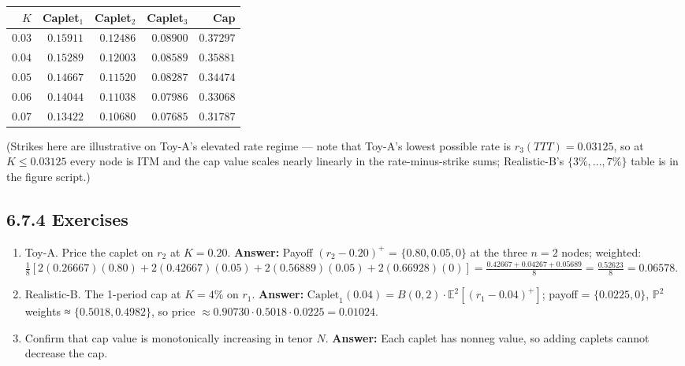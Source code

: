 \documentclass[
  10pt,
  twoside]{book}
\newcounter{none} %
\providecommand{\tightlist}{%
  \setlength{\itemsep}{0pt}\setlength{\parskip}{0pt}}
\begin{document}
{\def\LTcaptype{none} %
\begin{table}[H]
\centering
\begin{tabular}{|r|r|r|r|r|}
\toprule
\(K\) & Caplet\(_1\) & Caplet\(_2\) & Caplet\(_3\) & Cap \\
\midrule



\(0.03\) & \(0.15911\) & \(0.12486\) & \(0.08900\) & \(0.37297\) \\
\(0.04\) & \(0.15289\) & \(0.12003\) & \(0.08589\) & \(0.35881\) \\
\(0.05\) & \(0.14667\) & \(0.11520\) & \(0.08287\) & \(0.34474\) \\
\(0.06\) & \(0.14044\) & \(0.11038\) & \(0.07986\) & \(0.33068\) \\
\(0.07\) & \(0.13422\) & \(0.10680\) & \(0.07685\) & \(0.31787\) \\
\bottomrule
\end{tabular}
\end{table}
}

(Strikes here are illustrative on Toy-A's elevated rate regime --- note
that Toy-A's lowest possible rate is \(r_3(TTT) = 0.03125\), so at
\(K \leq 0.03125\) every node is ITM and the cap value scales nearly
linearly in the rate-minus-strike sums; Realistic-B's
\(\{3\%,..., 7\%\}\) table is in the figure script.)

\subsection{6.7.4 Exercises}\label{exercises-33}

\begin{enumerate}
\def\labelenumi{\arabic{enumi}.}
\tightlist
\item
  Toy-A. Price the caplet on \(r_2\) at \(K = 0.20\). \textbf{Answer:}
  Payoff \((r_2 - 0.20)^+\) = \(\{0.80, 0.05, 0\}\) at the three \(n=2\)
  nodes; weighted:
  \(\tfrac{1}{8}[2(0.26667)(0.80) + 2(0.42667)(0.05) + 2(0.56889)(0.05) + 2(0.66928)(0)] = \tfrac{0.42667 + 0.04267 + 0.05689}{8} = \tfrac{0.52623}{8} = 0.06578\).
\item
  Realistic-B. The 1-period cap at \(K = 4\%\) on \(r_1\).
  \textbf{Answer:}
  \(\text{Caplet}_1(0.04) = B(0, 2) \cdot \mathbb E^2[(r_1 - 0.04)^+]\);
  payoff = \(\{0.0225, 0\}\), \(\mathbb P^2\) weights ≈
  \(\{0.5018, 0.4982\}\), so price
  \(\approx 0.90730 \cdot 0.5018 \cdot 0.0225 = 0.01024\).
\item
  Confirm that cap value is monotonically increasing in tenor \(N\).
  \textbf{Answer:} Each caplet has nonneg value, so adding caplets
  cannot decrease the cap.
\end{enumerate}
\end{document}
